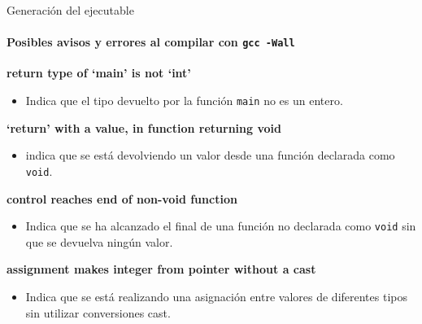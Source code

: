 \documentclass{beamer}
\begin{document}
	\begin{frame}{Generación del ejecutable}	
       \framesubtitle{Posibles avisos y errores al compilar con \texttt{gcc -Wall}}

\begin{footnotesize}
	\textbf{return type of `main' is not `int'} \\
\begin{itemize}
\vspace{-0.2cm}
\justifying\item[]  Indica que el tipo devuelto por la función \texttt{main} no es un entero.
\end{itemize}

	\textbf{`return' with a value, in function returning void} \\
\begin{itemize}
\vspace{-0.2cm}
\justifying\item[] indica que se está devolviendo un valor desde una función declarada como \texttt{void}.
\end{itemize}

	\textbf{control reaches end of non-void function} \\
\begin{itemize}
\vspace{-0.2cm}
\justifying\item[]  Indica que se ha alcanzado el final de una función no declarada como \texttt{void} sin que se devuelva ningún valor.
\end{itemize}

	\textbf{assignment makes integer from pointer without a cast} \\
\begin{itemize}
\vspace{-0.2cm}
\justifying\item[] Indica que se está realizando una asignación entre valores de diferentes tipos sin utilizar conversiones cast.
\end{itemize}

	\end{footnotesize}	
	
\end{frame}
\end{document}
